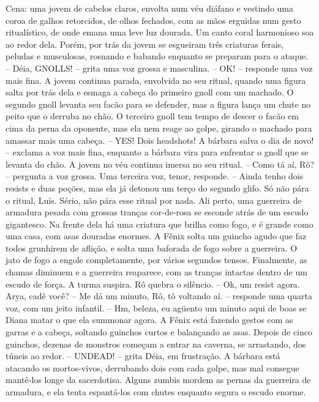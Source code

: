 ﻿

	Cena: uma jovem de cabelos claros, envolta num véu diáfano e vestindo uma coroa de galhos retorcidos, de olhos fechados, com as mãos erguidas num gesto ritualístico, de onde emana uma leve luz dourada. Um canto coral harmonioso soa ao redor dela. Porém, por trás da jovem se esgueiram três criaturas ferais, peludas e musculosas, rosnando e babando enquanto se preparam para o ataque.
	-- Déia, GNOLLS! -- grita uma voz grossa e masculina.
	-- OK! -- responde uma voz mais fina.
	A jovem continua parada, envolvida no seu ritual, quando uma figura salta por trás dela e esmaga a cabeça do primeiro gnoll com um machado. O segundo gnoll levanta seu facão para se defender, mas a figura lança um chute no peito que o derruba no chão. O terceiro gnoll tem tempo de descer o facão em cima da perna da oponente, mas ela nem reage ao golpe, girando o machado para amassar mais uma cabeça. 
	-- YES! Dois headshots! A bárbara salva o dia de novo! -- exclama a voz mais fina, enquanto a bárbara vira para enfrentar o gnoll que se levanta do chão.
	A jovem no véu continua imersa no seu ritual.
	-- Como tá aí, Rô? -- pergunta a voz grossa. Uma terceira voz, tenor, responde.
	-- Ainda tenho dois resists e duas poções, mas ela já detonou um terço do segundo glifo. Só não pára o ritual, Luís. Sério, não pára esse ritual por nada.
	Ali perto, uma guerreira de armadura pesada com grossas tranças cor-de-rosa se esconde atrás de um escudo gigantesco. Na frente dela há uma criatura que brilha como fogo, e é grande como uma casa, com asas douradas enormes. A Fênix solta um guincho agudo que faz todos grunhirem de aflição, e solta uma baforada de fogo sobre a guerreira. O jato de fogo a engole completamente, por vários segundos tensos. Finalmente, as chamas diminuem e a guerreira reaparece, com as tranças intactas dentro de um escudo de força. A turma suspira. Rô quebra o silêncio.
	-- Ok, um resist agora. Arya, cadê você?
	-- Me dá um minuto, Rô, tô voltando aí. -- responde uma quarta voz, com um jeito infantil.
	-- Hm, beleza, eu agüento um minuto aqui de boas se Diana matar o que ela summonar agora.
	A Fênix está fazendo gestos com as garras e a cabeça, soltando guinchos curtos e balançando as asas. Depois de cinco guinchos, dezenas de monstros começam a entrar na caverna, se arrastando, dos túneis ao redor.
	-- UNDEAD! -- grita Déia, em frustração. A bárbara está atacando os mortos-vivos, derrubando dois com cada golpe, mas mal consegue mantê-los longe da sacerdotisa. Alguns zumbis mordem as pernas da guerreira de armadura, e ela tenta espantá-los com chutes enquanto segura o escudo enorme.

